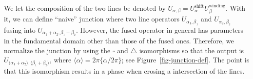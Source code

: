 \documentclass[
  letterpaper,
  DIV=11,
  numbers=noendperiod]{scrreport}
\begin{document}
We let the composition of the two lines be denoted by
\(U_{\alpha,\beta} = U^\text{shift}_\alpha U^\text{winding}_\beta\).
With it, we can define ``naive'' junction where two line operators
\(U_{\alpha_1,\beta_1}\) and \(U_{\alpha_2,\beta_2}\) fusing into
\(U_{\alpha_1+\alpha_2,\beta_1+\beta_2}\). However, the fused operator
in general has parameters in the fundamental domain other than those of
the fused ones. Therefore, we normalize the junction by using the
\(\square\) and \(\triangle\) isomorphisms so that the output is
\(U_{\langle \alpha_1+\alpha_2\rangle, \langle \beta_1+\beta_2\rangle}\),
where \(\langle \alpha \rangle = 2\pi\{\alpha/2\pi\}\); see
Figure~\ref{fig-junction-def}. The point is that this isomorphism
results in a phase when crosing a intersection of the lines.

\begin{figure}

\begin{minipage}[t]{0.30\linewidth}

{\centering 


}

\end{minipage}%
%
\begin{minipage}[t]{0.04\linewidth}

{\centering 

~

}

\end{minipage}%
%
\begin{minipage}[t]{0.65\linewidth}

{\centering 

}
\end{minipage}
\end{figure}
\end{document}
